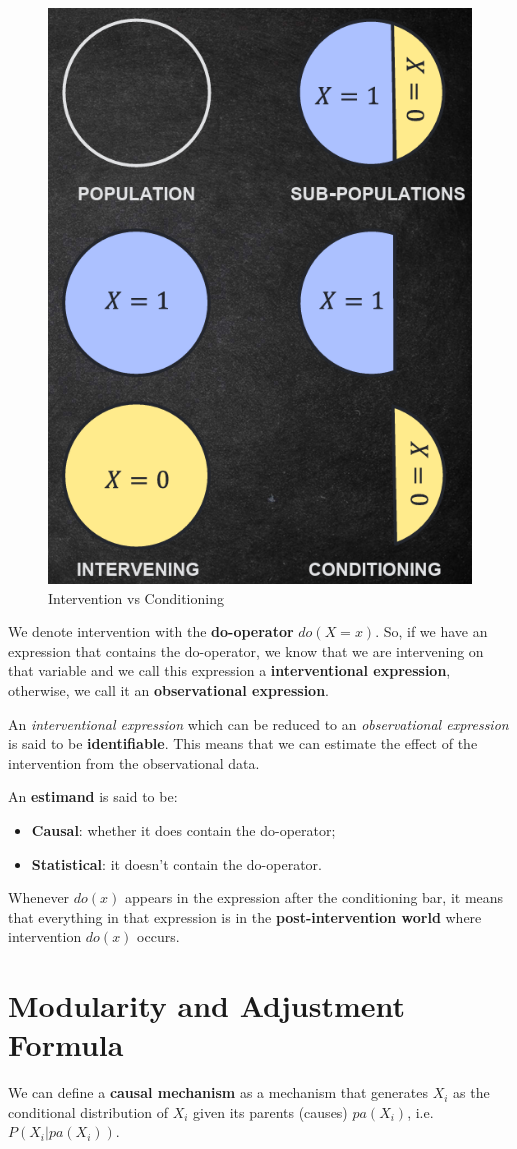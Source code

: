 \begin{figure}[!ht]
      \centering
      \includegraphics[width=0.3\linewidth]{img/causal_models/interventionVSconditioning.png}
      \caption{Intervention vs Conditioning}
      \label{fig:causal}
\end{figure}

We denote intervention with the \textbf{do-operator} $do(X = x)$. So, if we have
an expression that contains the do-operator, we know that we are intervening
on that variable and we call this expression a \textbf{interventional expression},
otherwise, we call it an \textbf{observational expression}.

An \textit{interventional expression} which can be reduced to an \textit{observational
      expression} is said to be \textbf{identifiable}. This means that we can
estimate the effect of the intervention from the observational data.

An \textbf{estimand} is said to be:
\begin{itemize}
      \item \textbf{Causal}: whether it does contain the do-operator;
      \item \textbf{Statistical}: it doesn't contain the do-operator.
\end{itemize}

Whenever $do(x)$ appears in the expression after the conditioning bar, it means
that everything in that expression is in the \textbf{post-intervention world}
where intervention $do(x)$ occurs.

\section{Modularity and Adjustment Formula}
We can define a \textbf{causal mechanism} as a mechanism that generates $X_i$ as
the conditional distribution of $X_i$ given its parents (causes) $pa(X_i)$, i.e. $P(X_i | pa(X_i))$.

